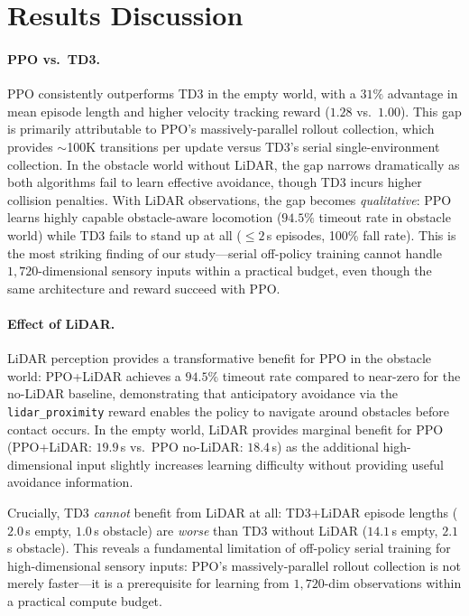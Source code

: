 \documentclass{article}
\begin{document}
\section{Results Discussion}

\paragraph{PPO vs.\ TD3.}
PPO consistently outperforms TD3 in the empty world, with a $31\%$ advantage
in mean episode length and higher velocity tracking reward ($1.28$ vs.\
$1.00$). This gap is primarily attributable to PPO's massively-parallel
rollout collection, which provides $\sim$100K transitions per update versus
TD3's serial single-environment collection.
In the obstacle world without LiDAR, the gap narrows dramatically as both
algorithms fail to learn effective avoidance, though TD3 incurs higher
collision penalties.
With LiDAR observations, the gap becomes \emph{qualitative}: PPO learns
highly capable obstacle-aware locomotion ($94.5\%$ timeout rate in obstacle
world) while TD3 fails to stand up at all ($\leq 2$\,s episodes, 100\%
fall rate). This is the most striking finding of our study—serial off-policy
training cannot handle $1{,}720$-dimensional sensory inputs within a
practical budget, even though the same architecture and reward succeed
with PPO.

\paragraph{Effect of LiDAR.}
LiDAR perception provides a transformative benefit for PPO in the obstacle
world: PPO+LiDAR achieves a $94.5\%$ timeout rate compared to near-zero for
the no-LiDAR baseline, demonstrating that anticipatory avoidance via the
\texttt{lidar\_proximity} reward enables the policy to navigate around
obstacles before contact occurs.
In the empty world, LiDAR provides marginal benefit for PPO
(PPO+LiDAR: $19.9$\,s vs.\ PPO no-LiDAR: $18.4$\,s) as the additional
high-dimensional input slightly increases learning difficulty without
providing useful avoidance information.

Crucially, TD3 \emph{cannot} benefit from LiDAR at all: TD3+LiDAR episode
lengths ($2.0$\,s empty, $1.0$\,s obstacle) are \emph{worse} than TD3
without LiDAR ($14.1$\,s empty, $2.1$\,s obstacle).
This reveals a fundamental limitation of off-policy serial training for
high-dimensional sensory inputs: PPO's massively-parallel rollout collection
is not merely faster—it is a prerequisite for learning from $1{,}720$-dim
observations within a practical compute budget.
\end{document}
